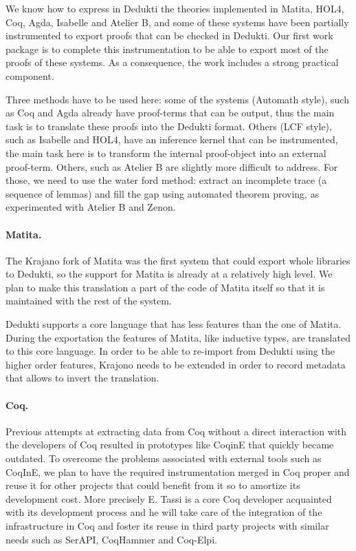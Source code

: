 We know how to express in Dedukti the theories implemented in Matita,
HOL4, Coq, Agda, Isabelle and Atelier B, and some of these systems
have been partially instrumented to export proofs that can be checked
in Dedukti. Our first work package is to complete this instrumentation
to be able to export most of the proofs of these systems. As a
consequence, the work includes a strong practical component.

Three methods have to be used here: some of the systems (Automath
style), such as Coq and Agda already have proof-terms that can be
output, thus the main task is to translate these proofs into the
Dedukti format. Others (LCF style), such as Isabelle and HOL4, have an
inference kernel that can be instrumented, the main task here is to
transform the internal proof-object into an external
proof-term. Others, such as Atelier B are slightly more difficult to
address. For those, we need to use the water ford method: extract an
incomplete trace (a sequence of lemmas) and fill the gap using
automated theorem proving, as experimented with Atelier B and Zenon.

\paragraph{Matita.}
The Krajano fork of Matita was the first system that could export
whole libraries to Dedukti, so the support for Matita is already at a
relatively high level. We plan to make this translation a part of the
code of Matita itself so that it is maintained with the rest of the
system.

Dedukti supports a core language that has less features than the one
of Matita. During the exportation the features of Matita, like
inductive types, are translated to this core language. In order to be
able to re-import from Dedukti using the higher order features,
Krajono needs to be extended in order to record metadata that allows
to invert the translation.

\paragraph{Coq.}
Previous attempts at extracting data from Coq without a direct
interaction with the developers of Coq resulted in prototypes like
CoqinE that quickly became outdated.  To overcome the problems
associated with external tools such as CoqInE, we plan to have the
required instrumentation merged in Coq proper and reuse it for other
projects that could benefit from it so to amortize its development
cost. More precisely E. Tassi is a core Coq developer acquainted with
its development process and he will take care of the integration of
the infrastructure in Coq and foster its reuse in third party projects
with similar needs such as SerAPI, CoqHammer and Coq-Elpi.

